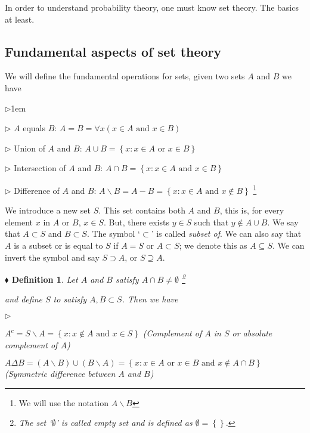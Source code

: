 \documentclass{report}
\newcommand*{\daggerfootnote}[1]{%
  \begingroup
  \renewcommand*{\thefootnote}{\fnsymbol{footnote}}%
  \footnote{#1}%
  \endgroup
}
\newtheorem{definition}{$\blacklozenge$ Definition}[chapter]
\begin{document}
In order to understand probability theory, one must know set theory. The basics at least.
\subsection{Fundamental aspects of set theory}
We will define the fundamental operations for sets, given two sets $A$ and $B$ we have
\begin{list}{$\triangleright$}{1em}
    \item[$\triangleright$] $A$ equals $B$: $A = B = \forall x (x\in A \text{ and } x\in B)$
    \item[$\triangleright$] Union of $A$ and $B$: $A\cup B = \left\{x: x\in A \text{ or } x \in B\right\}$
    \item[$\triangleright$] Intersection of $A$ and $B$: $A\cap B = \left\{x: x\in A \text{ and } x \in B\right\}$
    \item[$\triangleright$] Difference of $A$ and $B$: $A\backslash B = A - B= \left\{x: x\in A \text{ and } x\notin B\right\}$\daggerfootnote{We will use the notation $A\backslash B$}
\end{list}

We introduce a new set $S$. This set contains both $A$ and $B$, this is, for every element $x$ in $A$ or $B$,
$x\in S$. But, there exists $y\in S$ such that $y\notin A\cup B$. We say that $A\subset S$ and $B\subset S$. The
symbol `$\subset$' is called \textit{subset of}. We can also say that $A$ is a subset or is equal to $S$ if $A=S$
or $A \subset S$; we denote this as $A\subseteq S$. We can invert the symbol and say $S\supset A$, or $S \supseteq A$.

\begin{definition}
    Let $A$ and $B$ satisfy $A\cap B \neq \emptyset$\daggerfootnote{The set `$\emptyset$' is called \textit{empty set} and is defined as $\emptyset = \left\{\right\}$. }
    and define $S$ to satisfy $A,B\subset S$. Then we have
    \begin{list}{$\triangleright$}{}
        \item $A^{c} = S\backslash A = \left\{x: x\notin A \text{ and } x\in S\right\}$ (Complement of $A$ in $S$ or absolute complement of $A$)
        \item $A\Delta B = (A\backslash B) \cup (B \backslash A) = \left\{x: x\in A \text{ or } x\in B \text{ and } x \notin A\cap B\right\}$ (Symmetric difference between $A$ and $B$)
    \end{list}
\end{definition}
\end{document}
